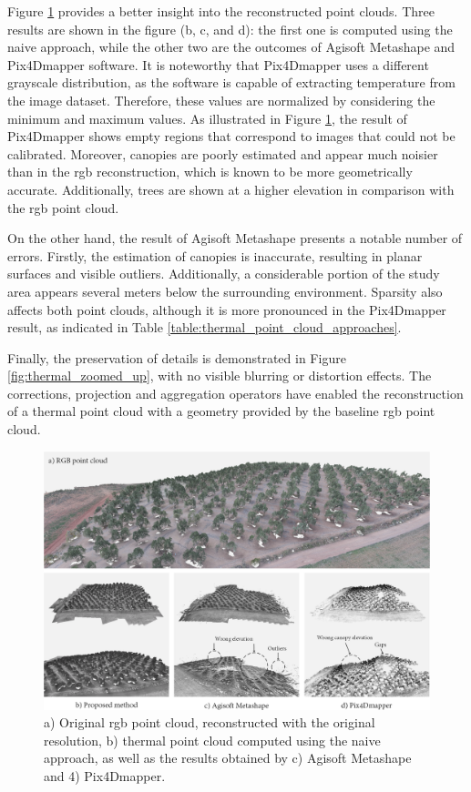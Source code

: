 Figure \ref{fig:thermal_point_cloud_comparison} provides a better insight into the reconstructed point clouds. Three results are shown in the figure (b, c, and d): the first one is computed using the naive approach, while the other two are the outcomes of Agisoft Metashape and Pix4Dmapper software. It is noteworthy that Pix4Dmapper uses a different grayscale distribution, as the software is capable of extracting temperature from the image dataset. Therefore, these values are normalized by considering the minimum and maximum values. As illustrated in Figure \ref{fig:thermal_point_cloud_comparison}, the result of Pix4Dmapper shows empty regions that correspond to images that could not be calibrated. Moreover, canopies are poorly estimated and appear much noisier than in the \acrshort{rgb} reconstruction, which is known to be more geometrically accurate. Additionally, trees are shown at a higher elevation in comparison with the \acrshort{rgb} point cloud.

On the other hand, the result of Agisoft Metashape presents a notable number of errors. Firstly, the estimation of canopies is inaccurate, resulting in planar surfaces and visible outliers. Additionally, a considerable portion of the study area appears several meters below the surrounding environment. Sparsity also affects both point clouds, although it is more pronounced in the Pix4Dmapper result, as indicated in Table \ref{table:thermal_point_cloud_approaches}. 

Finally, the preservation of details is demonstrated in Figure \ref{fig:thermal_zoomed_up}, with no visible blurring or distortion effects. The corrections, projection and aggregation operators have enabled the reconstruction of a thermal point cloud with a geometry provided by the baseline \acrshort{rgb} point cloud.

\begin{figure}[hbt]
    \centering
    \includegraphics[width=\linewidth]{figs/thermal_projection/thermal_visualization_comparison.png}
	\caption{a) Original \acrshort{rgb} point cloud, reconstructed with the original resolution, b) thermal point cloud computed using the naive approach, as well as the results obtained by c) Agisoft Metashape and 4) Pix4Dmapper. }
	\label{fig:thermal_point_cloud_comparison}
\end{figure}

